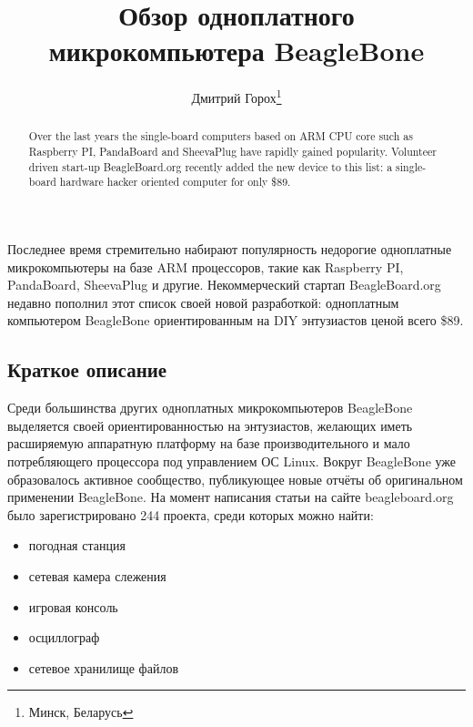 \documentclass[10pt, a5paper]{article}
\begin{document}
\title{Обзор одноплатного микрокомпьютера BeagleBone}%

\author{Дмитрий Горох\footnote{Минск, Беларусь}}
\maketitle

\begin{abstract}
Over the last years the single-board computers based on ARM CPU core such as Raspberry PI, PandaBoard and SheevaPlug have rapidly gained popularity. Volunteer driven start-up BeagleBoard.org recently added the new device to this list: a single-board hardware hacker oriented computer for only \$89.
\end{abstract}

Последнее время стремительно набирают популярность недорогие одноплатные микрокомпьютеры на базе ARM процессоров, такие как Raspberry PI, PandaBoard, SheevaPlug и другие. Некоммерческий стартап BeagleBoard.org недавно пополнил этот список своей новой разработкой: одноплатным компьютером BeagleBone ориентированным на DIY энтузиастов ценой всего \$89.

\subsection*{Краткое описание}



Среди большинства других одноплатных микрокомпьютеров BeagleBone выделяется своей ориентированностью на энтузиастов, желающих иметь расширяемую аппаратную платформу на базе производительного и мало потребляющего процессора под управлением ОС Linux. Вокруг BeagleBone уже образовалось активное сообщество, публикующее новые отчёты об оригинальном применении BeagleBone. На момент написания статьи на сайте beagleboard.org было зарегистрировано 244 проекта, среди которых можно найти:

\begin{itemize}
  \item погодная станция
  \item сетевая камера слежения
  \item игровая консоль
  \item осциллограф
  \item сетевое хранилище файлов
\end{itemize}
\end{document}
